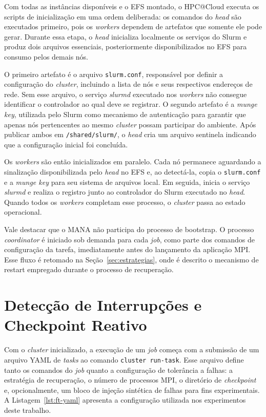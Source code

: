 Com todas as instâncias disponíveis e o EFS montado, o HPC@Cloud executa os scripts de
inicialização em uma ordem deliberada: os comandos do \textit{head} são executados primeiro, pois
os \textit{workers} dependem de artefatos que somente ele pode gerar. Durante essa etapa, o \textit{head} inicializa localmente os serviços do Slurm e produz dois arquivos essenciais, posteriormente disponibilizados no EFS para consumo pelos demais nós.

O primeiro artefato é o arquivo \texttt{slurm.conf}, responsável por definir a configuração do \textit{cluster}, incluindo a lista de nós e seus respectivos endereços de rede. Sem esse arquivo, o serviço \textit{slurmd} executado nos \textit{workers} não consegue identificar o controlador ao qual deve se registrar. O segundo artefato é a \textit{munge key}, utilizada pelo Slurm como mecanismo de autenticação para garantir que apenas nós pertencentes ao mesmo \textit{cluster} possam participar do ambiente. Após publicar ambos em \texttt{/shared/slurm/}, o \textit{head} cria um arquivo sentinela indicando que a configuração inicial foi concluída.

Os \textit{workers} são então inicializados em paralelo. Cada nó permanece aguardando a sinalização disponibilizada pelo \textit{head} no EFS e, ao detectá-la, copia o \texttt{slurm.conf} e a \textit{munge key} para seu sistema de arquivos local. Em seguida, inicia o serviço \textit{slurmd} e realiza o registro junto ao controlador do Slurm executado no \textit{head}. Quando todos os \textit{workers} completam esse processo, o \textit{cluster} passa ao estado operacional.

Vale destacar que o MANA não participa do processo de bootstrap. O processo \textit{coordinator} é iniciado sob demanda para cada \textit{job}, como parte dos comandos de configuração da tarefa, imediatamente antes do lançamento da aplicação MPI. Esse fluxo é retomado na Seção~\ref{sec:estrategias}, onde é descrito o mecanismo de restart empregado durante o processo de recuperação.

\section{Detecção de Interrupções e Checkpoint Reativo}
\label{sec:watcher}

Com o \textit{cluster} inicializado, a execução de um \textit{job} começa com a submissão de um arquivo
YAML de \textit{tasks} ao comando \texttt{cluster run-task}. Esse arquivo define tanto os
comandos do \textit{job} quanto a configuração de tolerância a falhas: a estratégia de
recuperação, o número de processos MPI, o diretório de \textit{checkpoint} e,
opcionalmente, um bloco de injeção sintética de falhas para fins experimentais.
A Listagem~\ref{lst:ft-yaml} apresenta a configuração utilizada nos experimentos
deste trabalho.

